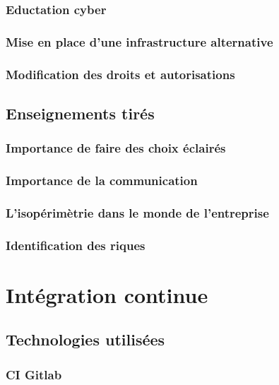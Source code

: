 \subsubsection{Eductation cyber}

\subsubsection{Mise en place d'une infrastructure alternative}

\subsubsection{Modification des droits et autorisations}


\subsection{Enseignements tirés}
\subsubsection{Importance de faire des choix éclairés}

\subsubsection{Importance de la communication}

\subsubsection{L'isopérimètrie dans le monde de l'entreprise}

\subsubsection{Identification des riques}



\section{Intégration continue}
\subsection{Technologies utilisées}
\subsubsection{CI Gitlab}

